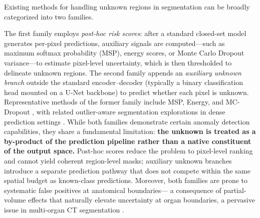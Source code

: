 \documentclass[3p,twocolumn,authoryear]{elsarticle}
\begin{document}
Existing methods for handling unknown regions in segmentation can be broadly
categorized into two families.

The first family employs \emph{post-hoc risk scores}:
after a standard closed-set model generates per-pixel predictions, auxiliary signals
are computed---such as maximum softmax probability (MSP), energy scores,
or Monte Carlo Dropout variance---to estimate pixel-level uncertainty,
which is then thresholded to delineate unknown regions.
The second family appends an \emph{auxiliary unknown branch} outside the standard
encoder–decoder (typically a binary classification head mounted on a U-Net backbone)
to predict whether each pixel is unknown.
Representative methods of the former family include MSP, Energy, and MC-Dropout
\cite{hendrycks2017baselinedetecting,liu2020energyout,gal2016dropoutbayesian},
with related outlier-aware segmentation explorations in dense prediction settings
\cite{grcic2023advantagesmask}.
While both families demonstrate certain anomaly detection capabilities,
they share a fundamental limitation:
\textbf{the unknown is treated as a by-product of the prediction pipeline
rather than a native constituent of the output space.}
Post-hoc scores reduce the problem to pixel-level ranking and cannot yield coherent
region-level masks; auxiliary unknown branches introduce a separate prediction pathway
that does not compete within the same spatial budget as known-class predictions.
Moreover, both families are prone to systematic false positives at anatomical boundaries---
a consequence of partial-volume effects that naturally elevate uncertainty at organ
boundaries, a pervasive issue in multi-organ CT segmentation
\cite{li2020superpixelguided,yeung2021incorporatingboundary,mukul2020uncertaintygraph,hassan2024udbrnetnovel}.

\end{document}
